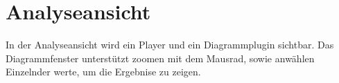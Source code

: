 \chapter{Analyseansicht}
In der Analyseansicht  wird ein Player und ein Diagrammplugin sichtbar. Das Diagrammfenster unterstützt zoomen mit dem Mausrad, sowie anwählen Einzelnder werte, um die Ergebnise zu zeigen.